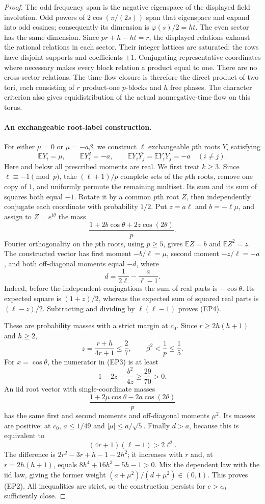 \documentclass[11pt,a4paper]{article}
\theoremstyle{definition}\newtheorem{definition}[theorem]{Definition}
\theoremstyle{remark}\newtheorem{remark}[theorem]{Remark}
\begin{document}
\begin{proof}
The odd frequency span is the negative eigenspace of the displayed
field involution. Odd powers of $2\cos(\pi/(2s))$ span that
eigenspace and expand into odd cosines; consequently its dimension
is $\varphi(s)/2=ht$. The even sector has the same dimension.
Since $pr+h-ht=r$, the displayed relations exhaust the rational
relations in each sector. Their integer lattices are saturated:
the rows have disjoint supports and coefficients $\pm1$.
Conjugating representative coordinates where necessary makes every
block relation a product equal to one. There are no cross-sector
relations. The time-flow closure is therefore the direct product
of two tori, each consisting of $r$ product-one $p$-blocks and
$h$ free phases. The character criterion also gives equidistribution
of the actual nonnegative-time flow on this torus.

\paragraph{An exchangeable root-label construction.}
For either $\mu=0$ or $\mu=-a\beta$, we construct $\ell$ exchangeable
$p$th roots $Y_i$ satisfying
\[
 \mathbb E Y_i=\mu,\qquad \mathbb E Y_i^2=-a,\qquad
 \mathbb E Y_i\overline{Y_j}=\mathbb E Y_iY_j=-a\quad(i\ne j).
\tag{EP2}
\]
Here and below all prescribed moments are real. We first treat $k\ge3$. Since
$\ell\equiv-1\pmod p$, take $(\ell+1)/p$ complete sets of the
$p$th roots, remove one copy of $1$, and uniformly permute the
remaining multiset. Its sum and its sum of squares both equal $-1$.
Rotate it by a common $p$th root $Z$, then independently conjugate
each coordinate with probability $1/2$. Put $z=a\ell$ and
$b=-\ell\mu$, and assign to $Z=e^{i\theta}$ the mass
\[
 \frac{1+2b\cos\theta+2z\cos(2\theta)}p.
\tag{EP3}
\]
Fourier orthogonality on the $p$th roots, using $p\ge5$, gives
$\mathbb EZ=b$ and $\mathbb EZ^2=z$. The constructed vector has
first moment $-b/\ell=\mu$, second moment $-z/\ell=-a$, and
both off-diagonal moments equal $-d$, where
\[
 d=\frac1{2\ell}-\frac{a}{\ell-1}.
\tag{EP4}
\]
Indeed, before the independent conjugations the sum of real parts
is $-\cos\theta$. Its expected square is $(1+z)/2$, whereas the
expected sum of squared real parts is $(\ell-z)/2$. Subtracting
and dividing by $\ell(\ell-1)$ proves (EP4).

These are probability masses with a strict margin at $c_0$.
Since $r\ge2h(h+1)$ and $h\ge2$,
\[
 z=\frac{r+h}{4r+1}\le\frac27,\qquad
 \beta^2<\frac1p\le\frac15.
\]
For $x=\cos\theta$, the numerator in (EP3) is at least
\[
 1-2z-\frac{b^2}{4z}\ge\frac{29}{70}>0.
\]
An iid root vector with single-coordinate masses
\[
 \frac{1+2\mu\cos\theta-2a\cos(2\theta)}p
\tag{EP5}
\]
has the same first and second moments and off-diagonal moments
$\mu^2$. Its masses are positive: at $c_0$, $a\le1/49$ and
$|\mu|\le a/\sqrt5$. Finally $d>a$, because this is equivalent to
\[
 (4r+1)(\ell-1)>2\ell^2.
\]
The difference is $2r^2-3r+h-1-2h^2$; it increases with $r$
and, at $r=2h(h+1)$, equals $8h^4+16h^3-5h-1>0$.
Mix the dependent law with the iid law, giving the former weight
$(a+\mu^2)/(d+\mu^2)\in(0,1)$. This proves (EP2).
All inequalities are strict, so the construction persists for
$c>c_0$ sufficiently close.


\end{proof}
\end{document}
